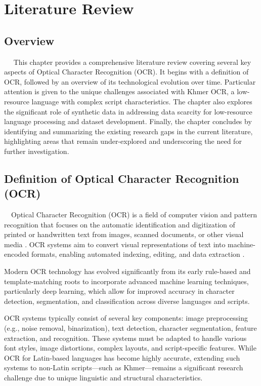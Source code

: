 \chapter{Literature Review}
\label{ch:literature}

\section{Overview}
\label{sec:ocr-overview}
​ ​ ​ ​ This chapter provides a comprehensive literature review covering several 
key aspects of Optical Character Recognition (OCR). 
It begins with a definition of OCR, followed by an overview of its technological
 evolution over time. Particular attention is given to the unique challenges 
 associated with Khmer OCR, a low-resource language with complex script characteristics.
  The chapter also explores the significant role of synthetic data in addressing data 
  scarcity for low-resource language processing and dataset development.
   Finally, the chapter concludes by identifying and summarizing the existing 
   research gaps in the current literature, highlighting areas that remain 
   under-explored and underscoring the need for further investigation.


\section{Definition of Optical Character Recognition (OCR)}
\label{sec:ocr-definition}
​ ​ ​ ​ Optical Character Recognition (OCR) is a field of computer vision and pattern recognition
 that focuses on the automatic identification and digitization of printed or handwritten 
 text from images, scanned documents, or other visual media \citep{singh2012survey}. 
 OCR systems aim to convert visual representations of text into machine-encoded formats, 
 enabling automated indexing, editing, and data extraction \citep{muaz2015khmerocr}.

Modern OCR technology has evolved significantly from its early rule-based and template-matching
roots to incorporate advanced machine learning techniques, particularly deep learning,
which allow for improved accuracy in character detection, segmentation, and classification across 
diverse languages and scripts.

OCR systems typically consist of several key components: image preprocessing (e.g., noise removal, binarization), text detection, character segmentation, feature extraction, and recognition. These systems must be adapted to handle various font styles, image distortions, complex layouts, and script-specific features. While OCR for Latin-based languages has become highly accurate, extending such systems to non-Latin scripts—such as Khmer—remains a significant research challenge due to unique linguistic and structural characteristics.
  

